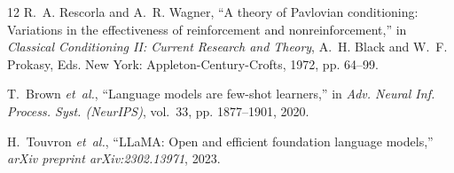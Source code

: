 \documentclass[10pt,conference]{IEEEtran}
\begin{document}
\begin{thebibliography}{12}
R.~A. Rescorla and A.~R. Wagner, ``A theory of Pavlovian conditioning: Variations in the effectiveness of reinforcement and nonreinforcement,'' in \emph{Classical Conditioning II: Current Research and Theory}, A.~H. Black and W.~F. Prokasy, Eds. New York: Appleton-Century-Crofts, 1972, pp. 64--99.

T.~Brown \emph{et~al.}, ``Language models are few-shot learners,'' in \emph{Adv. Neural Inf. Process. Syst. (NeurIPS)}, vol.~33, pp. 1877--1901, 2020.

H.~Touvron \emph{et~al.}, ``LLaMA: Open and efficient foundation language models,'' \emph{arXiv preprint arXiv:2302.13971}, 2023.
\end{thebibliography}
\end{document}
